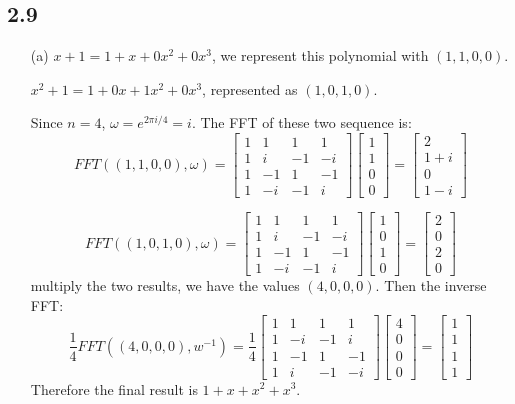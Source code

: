 \documentclass[twoside]{homework}
\begin{document}
\subsection*{2.9}
\begin{enumerate}
	\item [(a)] $x+1 = 1 + x + 0x^2 + 0x^3$, we represent this polynomial with $(1, 1, 0, 0)$.

	$x^2 + 1 = 1 + 0x + 1x^2 + 0x^3$, represented as $(1, 0, 1, 0)$.

	Since $n = 4$, $\omega = e^{2\pi i/4} = i$. The FFT of these two sequence is:
	\[FFT((1, 1, 0, 0), \omega) = \begin{bmatrix}
		1 & 1 & 1 & 1 \\
		1 & i & -1 & -i \\
		1 & -1 & 1 & -1 \\
		1 & -i & -1 & i
	\end{bmatrix} \begin{bmatrix}
		1 \\ 1\\ 0\\ 0
	\end{bmatrix}
	= \begin{bmatrix}
		2 \\ 1 + i \\ 0 \\ 1 - i
	\end{bmatrix}
	\]

	\[FFT((1, 0, 1, 0), \omega) = \begin{bmatrix}
		1 & 1 & 1 & 1 \\
		1 & i & -1 & -i \\
		1 & -1 & 1 & -1 \\
		1 & -i & -1 & i
	\end{bmatrix} \begin{bmatrix}
		1 \\ 0\\ 1\\ 0
	\end{bmatrix}
	= \begin{bmatrix}
		2 \\ 0 \\ 2 \\ 0
	\end{bmatrix}
	\]
	multiply the two results, we have the values $(4, 0, 0, 0)$. Then the inverse FFT:
	\[\frac{1}{4}FFT((4,0,0,0), w^{-1}) = \frac{1}{4}\begin{bmatrix}
		1 & 1 & 1 & 1 \\
		1 & -i & -1 & i \\
		1 & -1 & 1 & -1 \\
		1 & i & -1 & -i
	\end{bmatrix} \begin{bmatrix}
		4 \\ 0 \\ 0 \\ 0
	\end{bmatrix}
	= \begin{bmatrix}
		1 \\ 1 \\ 1 \\ 1
	\end{bmatrix}\]
	Therefore the final result is $1 + x + x^2 + x^3$.


\end{enumerate}
\end{document}
